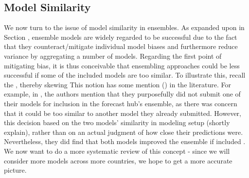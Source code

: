\subsection{Model Similarity}
We now turn to the issue of model similarity in ensembles. As expanded upon in Section , ensemble models are widely regarded to be successful due to the fact that they counteract/mitigate individual model biases and furthermore reduce variance by aggregating a number of models. Regarding the first point of mitigating bias, it is thus conceivable that ensembling approaches could be less successful if some of the included models are too similar. To illustrate this, recall the , thereby skewing 
This notion has some mention () in the literature. For example, in \cite{bosse_comparing_2021-1}, the authors mention that they purposefully did not submit one of their models for inclusion in the forecast hub's ensemble, as there was concern that it could be too similar to another model they already submitted. However, this decision based on the two models' similarity in modeling setup (shortly explain), rather than on an actual judgment of how close their predictions were. Nevertheless, they did find that both models improved the ensemble if included . We now want to do a more systematic review of this concept - since we will consider more models across more countries, we hope to get a more accurate picture.\\
